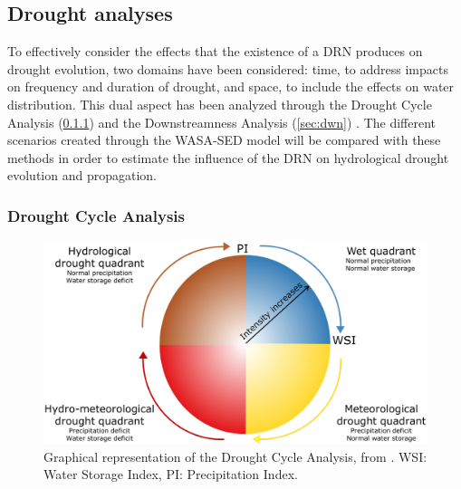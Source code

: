 \documentclass[draft]{agujournal2019}
\begin{document}
\subsection{Drought analyses}\label{sec:analyses}
To effectively consider the effects that the existence of a DRN produces on drought evolution, two domains have been considered: time, to address impacts on frequency and duration of drought, and space, to include the effects on water distribution. This dual aspect has been analyzed through the Drought Cycle Analysis (\ref{sec:DCA}) \cite{RibeiroNeto2022} and the Downstreamness Analysis (\ref{sec:dwn}) \cite{VanOel2011}. The different scenarios created through the WASA-SED model will be compared with these methods in order to estimate the influence of the DRN on hydrological drought evolution and propagation.

\subsubsection{Drought Cycle Analysis}\label{sec:DCA}

\begin{figure}
 \noindent\includegraphics[width=\textwidth]{images/Figure_3.jpg}
 \caption{Graphical representation of the Drought Cycle Analysis, from . WSI: Water Storage Index, PI: Precipitation Index.}
 \label{fig3}
\end{figure}
\end{document}
